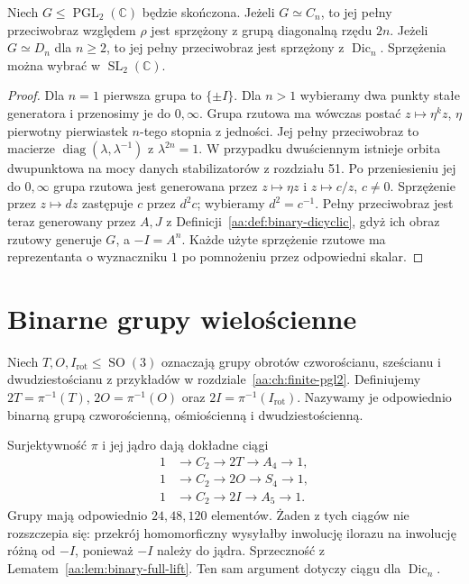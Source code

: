 \begin{lemat}
\label{aa:lem:binary-cyclic-dihedral}
Niech $G\le\operatorname{PGL}_2(\mathbb C)$ będzie
skończona. Jeżeli $G\simeq C_n$, to jej pełny
przeciwobraz względem $\rho$ jest sprzężony
z grupą diagonalną rzędu $2n$.
Jeżeli $G\simeq D_n$ dla $n\ge2$, to jej pełny
przeciwobraz jest sprzężony z $\operatorname{Dic}_n$.
Sprzężenia można wybrać w $\operatorname{SL}_2(\mathbb C)$.
\end{lemat}
\begin{proof}
Dla $n=1$ pierwsza grupa to $\{\pm I\}$.
Dla $n>1$ wybieramy dwa punkty stałe generatora
i przenosimy je do $0,\infty$. Grupa rzutowa ma
wówczas postać $z\mapsto\eta^k z$, $\eta$ pierwotny
pierwiastek $n$-tego stopnia z jedności. Jej pełny
przeciwobraz to macierze
$\operatorname{diag}(\lambda,\lambda^{-1})$ z
$\lambda^{2n}=1$.
W przypadku dwuściennym istnieje orbita dwupunktowa
na mocy danych stabilizatorów z rozdziału 51.
Po przeniesieniu jej do $0,\infty$ grupa rzutowa jest
generowana przez $z\mapsto\eta z$ i $z\mapsto c/z$,
$c\ne0$. Sprzężenie przez $z\mapsto dz$ zastępuje
$c$ przez $d^2c$; wybieramy $d^2=c^{-1}$.
Pełny przeciwobraz jest teraz generowany przez
$A,J$ z Definicji~\ref{aa:def:binary-dicyclic}, gdyż
ich obraz rzutowy generuje $G$, a $-I=A^n$.
Każde użyte sprzężenie rzutowe ma reprezentanta
o wyznaczniku $1$ po pomnożeniu przez odpowiedni skalar.
\end{proof}

\section{Binarne grupy wielościenne}

\begin{definicja}
\label{aa:def:binary-exceptional}
Niech $T,O,I_{\mathrm{rot}}\le\operatorname{SO}(3)$
oznaczają grupy obrotów czworościanu, sześcianu
i dwudziestościanu z przykładów
w rozdziale~\ref{aa:ch:finite-pgl2}.
Definiujemy
$2T=\pi^{-1}(T)$, $2O=\pi^{-1}(O)$ oraz
$2I=\pi^{-1}(I_{\mathrm{rot}})$.
Nazywamy je odpowiednio binarną grupą czworościenną,
ośmiościenną i dwudziestościenną.
\end{definicja}

Surjektywność $\pi$ i jej jądro dają dokładne ciągi
\[
 \begin{aligned}
 1&\to C_2\to 2T\to A_4\to1,\\
 1&\to C_2\to 2O\to S_4\to1,\\
 1&\to C_2\to 2I\to A_5\to1.
 \end{aligned}
\]
Grupy mają odpowiednio $24,48,120$ elementów.
Żaden z tych ciągów nie rozszczepia się:
przekrój homomorficzny wysyłałby inwolucję ilorazu
na inwolucję różną od $-I$, ponieważ $-I$ należy
do jądra. Sprzeczność z Lematem~\ref{aa:lem:binary-full-lift}.
Ten sam argument dotyczy ciągu dla $\operatorname{Dic}_n$.

